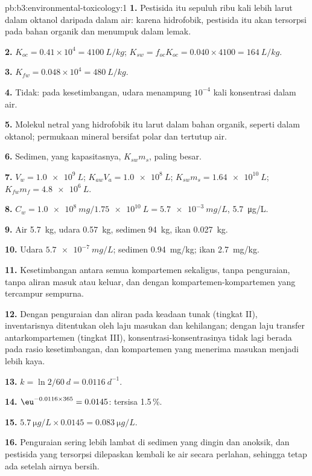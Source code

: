 \begin{solution}{pb:b3:environmental-toxicology:1}
\textbf{1.} Pestisida itu sepuluh ribu kali lebih larut dalam oktanol daripada dalam air: karena hidrofobik,
pestisida itu akan tersorpsi pada bahan organik dan menumpuk dalam lemak.

\textbf{2.} $K_{oc} = 0.41 \times 10^4 = \qty{4100}{L/kg}$; $K_{sw} = f_{oc}K_{oc} = 0.040 \times 4100 = \qty{164}{L/kg}$.

\textbf{3.} $K_{fw} = 0.048 \times 10^4 = \qty{480}{L/kg}$.

\textbf{4.} Tidak: pada kesetimbangan, udara menampung $10^{-4}$ kali konsentrasi dalam air.

\textbf{5.} Molekul netral yang hidrofobik itu larut dalam bahan organik, seperti dalam
oktanol; permukaan mineral bersifat polar dan tertutup air.

\textbf{6.} Sedimen, yang kapasitasnya, $K_{sw}m_s$, paling besar.

\textbf{7.} $V_w = \qty{1.0e9}{L}$; $K_{aw}V_a = \qty{1.0e8}{L}$; $K_{sw}m_s = \qty{1.64e10}{L}$; $K_{fw}m_f = \qty{4.8e6}{L}$.

\textbf{8.} $C_w = \qty{1.0e8}{mg}/\qty{1.75e10}{L} = \qty{5.7e-3}{mg/L}$, \qty{5.7}{\micro g/L}.

\textbf{9.} Air \qty{5.7}{kg}, udara \qty{0.57}{kg}, sedimen \qty{94}{kg}, ikan \qty{0.027}{kg}.

\textbf{10.} Udara $\qty{5.7e-7}{mg/L}$; sedimen \qty{0.94}{mg/kg}; ikan \qty{2.7}{mg/kg}.

\textbf{11.} Kesetimbangan antara semua kompartemen sekaligus, tanpa penguraian, tanpa
aliran masuk atau keluar, dan dengan kompartemen-kompartemen yang tercampur sempurna.

\textbf{12.} Dengan penguraian dan aliran pada keadaan tunak (tingkat II), inventarisnya ditentukan oleh
laju masukan dan kehilangan; dengan laju transfer antarkompartemen (tingkat III),
konsentrasi-konsentrasinya tidak lagi berada pada rasio kesetimbangan, dan kompartemen yang
menerima masukan menjadi lebih kaya.

\textbf{13.} $k = \ln 2/\qty{60}{d} = \qty{0.0116}{d^{-1}}$.

\textbf{14.} $\eu^{-0.0116 \times 365} = 0.0145$: tersisa 1.5\,\%.

\textbf{15.} $\qty{5.7}{\micro g/L} \times 0.0145 = \qty{0.083}{\micro g/L}$.

\textbf{16.} Penguraian sering lebih lambat di sedimen yang dingin dan anoksik, dan pestisida
yang tersorpsi dilepaskan kembali ke air secara perlahan, sehingga tetap ada setelah
airnya bersih.


\end{solution}

